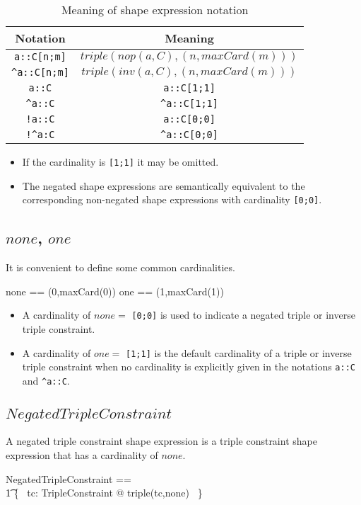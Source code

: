 \documentclass{article}
\begin{document}
\begin{table}[h]
\begin{center}
\begin{tabular}{|c|c|}
\hline
Notation				& Meaning \\
\hline
{\tt a::C[n;m]}			& $triple(nop(a,C),(n,maxCard(m)))$\\
{\tt \verb+^+a::C[n;m]}	& $triple(inv(a,C),(n,maxCard(m)))$ \\
\hline
{\tt a::C}				& {\tt a::C[1;1]}\\
{\tt \verb+^+a::C}		& {\tt \verb+^+a::C[1;1]} \\
\hline
{\tt !a::C}				& {\tt a::C[0;0]} \\
{\tt !\verb+^+a:C}		& {\tt \verb+^+a::C[0;0]} \\
\hline
\end{tabular}
\end{center}
\caption{Meaning of shape expression notation}
\label{notation-meaning}
\end{table}
\begin{itemize}
\item If the cardinality is {\tt [1;1]} it may be omitted.
\item The negated shape expressions are semantically equivalent to the corresponding non-negated shape expressions with cardinality {\tt [0;0]}.
\end{itemize}

\subsection{$none$, $one$}
It is convenient to define some common cardinalities.
\begin{zed}
	none == (0,maxCard(0))
\also
	one == (1,maxCard(1))
\end{zed}
\begin{itemize}
\item A cardinality of $none =$ {\tt [0;0]} is used to indicate a negated triple or inverse triple constraint.
\item A cardinality of $one =$ {\tt [1;1]} is the default cardinality of a triple or inverse triple constraint
when no cardinality is explicitly given in the notations {\tt a::C} and {\tt \verb+^+a::C}.
\end{itemize}

\subsection{$NegatedTripleConstraint$}
A negated triple constraint shape expression is a triple constraint shape expression that has a cardinality of $none$.
\begin{zed}
	NegatedTripleConstraint == \\
\t1		\{~ tc: TripleConstraint @ triple(tc,none) ~\}
\end{zed}
\end{document}
